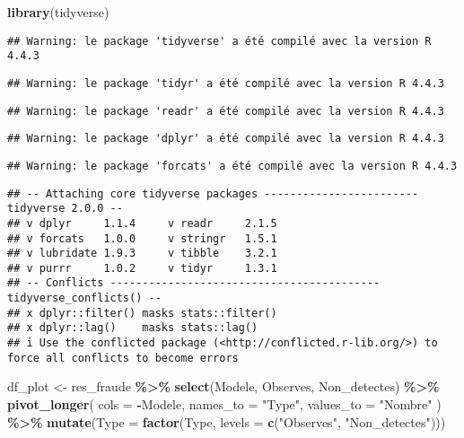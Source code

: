 \documentclass[
]{article}
\newenvironment{Shaded}{\begin{snugshade}}{\end{snugshade}}
\newcommand{\AttributeTok}[1]{\textcolor[rgb]{0.13,0.29,0.53}{#1}}
\newcommand{\FunctionTok}[1]{\textcolor[rgb]{0.13,0.29,0.53}{\textbf{#1}}}
\newcommand{\NormalTok}[1]{#1}
\newcommand{\OtherTok}[1]{\textcolor[rgb]{0.56,0.35,0.01}{#1}}
\newcommand{\SpecialCharTok}[1]{\textcolor[rgb]{0.81,0.36,0.00}{\textbf{#1}}}
\newcommand{\StringTok}[1]{\textcolor[rgb]{0.31,0.60,0.02}{#1}}
\begin{document}
\begin{Shaded}
\begin{Highlighting}[]
\FunctionTok{library}\NormalTok{(tidyverse)}
\end{Highlighting}
\end{Shaded}

\begin{verbatim}
## Warning: le package 'tidyverse' a été compilé avec la version R 4.4.3
\end{verbatim}

\begin{verbatim}
## Warning: le package 'tidyr' a été compilé avec la version R 4.4.3
\end{verbatim}

\begin{verbatim}
## Warning: le package 'readr' a été compilé avec la version R 4.4.3
\end{verbatim}

\begin{verbatim}
## Warning: le package 'dplyr' a été compilé avec la version R 4.4.3
\end{verbatim}

\begin{verbatim}
## Warning: le package 'forcats' a été compilé avec la version R 4.4.3
\end{verbatim}

\begin{verbatim}
## -- Attaching core tidyverse packages ------------------------ tidyverse 2.0.0 --
## v dplyr     1.1.4     v readr     2.1.5
## v forcats   1.0.0     v stringr   1.5.1
## v lubridate 1.9.3     v tibble    3.2.1
## v purrr     1.0.2     v tidyr     1.3.1
## -- Conflicts ------------------------------------------ tidyverse_conflicts() --
## x dplyr::filter() masks stats::filter()
## x dplyr::lag()    masks stats::lag()
## i Use the conflicted package (<http://conflicted.r-lib.org/>) to force all conflicts to become errors
\end{verbatim}

\begin{Shaded}
\begin{Highlighting}[]
\NormalTok{df\_plot }\OtherTok{\textless{}{-}}\NormalTok{ res\_fraude }\SpecialCharTok{\%\textgreater{}\%}
  \FunctionTok{select}\NormalTok{(Modele, Observes, Non\_detectes) }\SpecialCharTok{\%\textgreater{}\%}
  \FunctionTok{pivot\_longer}\NormalTok{(}
    \AttributeTok{cols =} \SpecialCharTok{{-}}\NormalTok{Modele,}
    \AttributeTok{names\_to =} \StringTok{"Type"}\NormalTok{,}
    \AttributeTok{values\_to =} \StringTok{"Nombre"}
\NormalTok{  ) }\SpecialCharTok{\%\textgreater{}\%}
  \FunctionTok{mutate}\NormalTok{(}\AttributeTok{Type =} \FunctionTok{factor}\NormalTok{(Type, }\AttributeTok{levels =} \FunctionTok{c}\NormalTok{(}\StringTok{"Observes"}\NormalTok{, }\StringTok{"Non\_detectes"}\NormalTok{)))}
\end{Highlighting}
\end{Shaded}
\end{document}
